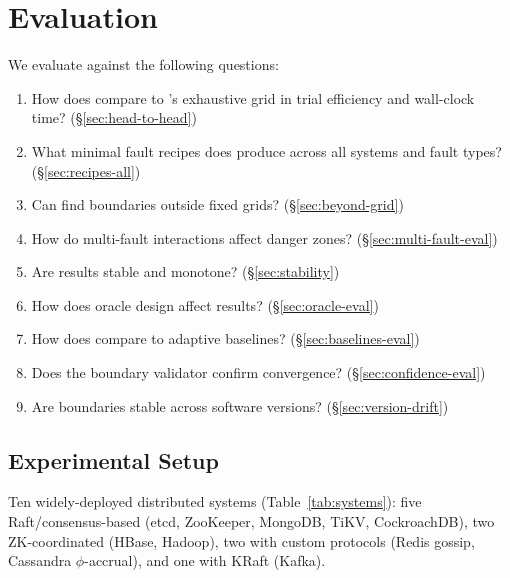 \section{Evaluation}
\label{sec:eval}

We evaluate \system{} against the following questions:

\begin{enumerate}[leftmargin=*,topsep=4pt,itemsep=2pt]
  \item[\textbf{Q1}] How does \system{} compare to \xinda{}'s exhaustive grid
        in trial efficiency and wall-clock time? (\S\ref{sec:head-to-head})
  \item[\textbf{Q2}] What minimal fault recipes does \system{} produce across
        all systems and fault types? (\S\ref{sec:recipes-all})
  \item[\textbf{Q3}] Can \system{} find boundaries outside fixed grids?
        (\S\ref{sec:beyond-grid})
  \item[\textbf{Q4}] How do multi-fault interactions affect danger zones?
        (\S\ref{sec:multi-fault-eval})
  \item[\textbf{Q5}] Are results stable and monotone?
        (\S\ref{sec:stability})
  \item[\textbf{Q6}] How does oracle design affect results?
        (\S\ref{sec:oracle-eval})
  \item[\textbf{Q7}] How does \system{} compare to adaptive baselines?
        (\S\ref{sec:baselines-eval})
  \item[\textbf{Q8}] Does the boundary validator confirm convergence?
        (\S\ref{sec:confidence-eval})
  \item[\textbf{Q9}] Are boundaries stable across software versions?
        (\S\ref{sec:version-drift})
\end{enumerate}

\subsection{Experimental Setup}
\label{sec:setup}

 Ten widely-deployed distributed systems
(Table~\ref{tab:systems}): five Raft/consensus-based (etcd, ZooKeeper, MongoDB,
TiKV, CockroachDB), two ZK-coordinated (HBase, Hadoop), two with custom
protocols (Redis gossip, Cassandra $\phi$-accrual), and one with KRaft (Kafka).

